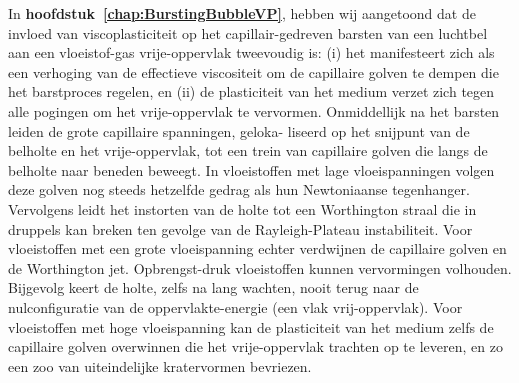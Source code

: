 In \textbf{hoofdstuk~\ref{chap:BurstingBubbleVP}}, hebben wij aangetoond dat de invloed van viscoplasticiteit op het capillair-gedreven barsten van een luchtbel aan een vloeistof-gas vrije-oppervlak tweevoudig is: (i) het manifesteert zich als een verhoging van de effectieve viscositeit om de capillaire golven te dempen die het barstproces regelen, en (ii) de plasticiteit van het medium verzet zich tegen alle pogingen om het vrije-oppervlak te vervormen. Onmiddellijk na het barsten leiden de grote capillaire spanningen, geloka- liseerd op het snijpunt van de belholte en het vrije-oppervlak, tot een trein van capillaire golven die langs de belholte naar beneden beweegt. In vloeistoffen met lage vloeispanningen volgen deze golven nog steeds hetzelfde gedrag als hun Newtoniaanse tegenhanger. Vervolgens leidt het instorten van de holte tot een Worthington straal die in druppels kan breken ten gevolge van de Rayleigh-Plateau instabiliteit. Voor vloeistoffen met een grote vloeispanning echter verdwijnen de capillaire golven en de Worthington jet. Opbrengst-druk vloeistoffen kunnen vervormingen volhouden. Bijgevolg keert de holte, zelfs na lang wachten, nooit terug naar de nulconfiguratie van de oppervlakte-energie (een vlak vrij-oppervlak). Voor vloeistoffen met hoge vloeispanning kan de plasticiteit van het medium zelfs de capillaire golven overwinnen die het vrije-oppervlak trachten op te leveren, en zo een zoo van uiteindelijke kratervormen bevriezen.

